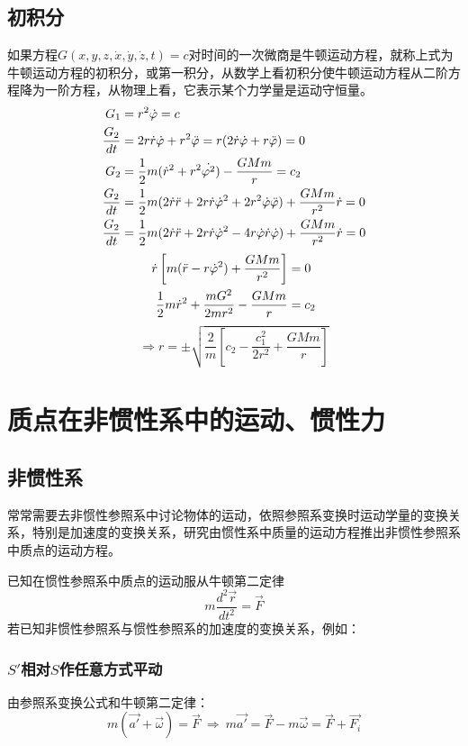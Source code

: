 \subsection{初积分}
如果方程$G(x,y,z,\dot x,\dot y,\dot z,t)=c$对时间的一次微商是牛顿运动方程，就称上式为牛顿运动方程的初积分，或第一积分，从数学上看初积分使牛顿运动方程从二阶方程降为一阶方程，从物理上看，它表示某个力学量是运动守恒量。
\begin{align}
G_1&=r^2\dot\varphi=c \notag \\
\frac{G_2}{dt}&=2r\dot r\dot\varphi+r^2\ddot \varphi = r(2\dot r\dot\varphi+r\ddot\varphi)=0\notag \\
G_2&=\frac{1}{2}m(\dot r^2+r^2\dot{\varphi^2})-\frac{GMm}{r}=c_2 \notag \\
\frac{G_2}{dt}&=\frac{1}{2}m(2\dot r\ddot r+2 r \dot r \dot\varphi^2+2 r^2\dot\varphi\ddot\varphi)+\frac{GMm}{r^2}\dot{r}=0 \notag \\
\frac{G_2}{dt}&=\frac{1}{2}m(2\dot r\ddot r+2r \dot r \dot\varphi^2-4r\dot\varphi\dot r\dot\varphi)+\frac{GMm}{r^2}\dot{r}=0 \notag
\end{align}
\begin{align}
\dot r\left[ m(\ddot r-r\dot\varphi^2)+\frac{GMm}{r^2}\right]&=0 \notag \\
\frac{1}{2}m\dot r^2+\frac{mG^2}{2mr^2}-\frac{GMm}{r}&=c_2 \notag
\end{align}
\[ \Rightarrow r=\pm \sqrt{\frac{2}{m}\left[ c_2-\frac{c_1^2}{2r^2}+\frac{GMm}{r}\right] }\]
\section{质点在非惯性系中的运动、惯性力}
\subsection{非惯性系}
常常需要去非惯性参照系中讨论物体的运动，依照参照系变换时运动学量的变换关系，特别是加速度的变换关系，研究由惯性系中质量的运动方程推出非惯性参照系中质点的运动方程。

已知在惯性参照系中质点的运动服从牛顿第二定律
\[m\frac{d^2 \vec{r}}{dt^2}=\vec{F}\]
若已知非惯性参照系与惯性参照系的加速度的变换关系，例如：
\subsubsection{$S'$相对$S$作任意方式平动}由参照系变换公式和牛顿第二定律：
\[m(\vec{a'}+\vec{\omega})=\vec{F}\  \Rightarrow \ m\vec{a'}=\vec{F}-m\vec{\omega}=\vec{F}+\vec{F_i}\]

